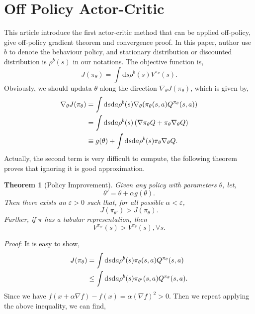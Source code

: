 \documentclass[11pt,a4paper]{article}
\def\d{{\mathrm d}}
\def\epsilon{\varepsilon}
\newtheorem{theorem}{Theorem}[subsection]
\begin{document}
\section{Off Policy Actor-Critic}
This article\cite{degris2012off} introduce the first actor-critic method that can be applied off-policy, give off-policy gradient theorem and convergence proof. In this paper, author use $b$ to denote the behaviour policy, and stationary distribution or discounted distribution is $\rho^{b}(s)$ in our notations. The objective function is,
\begin{equation}
J(\pi_{\theta}) = \int \d s \rho^b(s)V^{\pi_\theta}(s).
\end{equation}
Obviously, we should updata $\theta$ along the direction $\nabla_{\theta}J(\pi_{\theta})$, which is given by,
\begin{equation}
\aligned 
\nabla_{\theta} J(\pi_{\theta}) & = \int \d s \d a \rho^b(s) \nabla_{\theta}(\pi_{\theta}(s,a)Q^{\pi_{\theta}}(s,a)) \\ 
& = \int \d s\d a \rho^b(s)\left(\nabla \pi_{\theta}Q + \pi_{\theta}\nabla_{\theta}Q\right) \\ 
& \equiv g(\theta) + \int \d s \d a \rho^b(s)\pi_{\theta}\nabla_\theta Q.
\endaligned 
\end{equation}
Actually, the second term is very difficult to compute, the following theorem proves that ignoring it is good approximation.
\begin{theorem}[Policy Improvement]
Given any policy with parameters $\theta$, let,
\begin{equation}
\theta' = \theta + \alpha g(\theta).
\end{equation}
Then there exists an $\epsilon > 0$ such that, for all possible $\alpha < \epsilon$,
\begin{equation}
J(\pi_{\theta'}) > J(\pi_{\theta}).
\end{equation}
Further, if $\pi$ has a tabular representation, then
\begin{equation}
 V^{\pi_{\theta'}}(s) > V^{\pi_{\theta}}(s), \forall s.
 \end{equation} 
\end{theorem}
\emph{Proof}:
It is easy to show,
\begin{equation}
\aligned 
J(\pi_{\theta}) & = \int \d s\d a\rho^{b}(s)\pi_{\theta}(s,a)Q^{\pi_{\theta}}(s,a) \\
& \le \int \d s \d a \rho^{b}(s)\pi_{\theta'}(s,a)Q^{\pi_{\theta}}(s,a). 
\endaligned 
\end{equation}
Since we have $f(x+\alpha \nabla f) - f(x) = \alpha (\nabla f)^2 > 0$. Then we repeat applying the above inequality, we can find,
\end{document}

